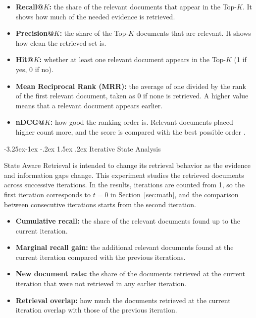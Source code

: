 \documentclass[12pt,a4paper]{report}
\makeatletter
\renewcommand\subsection{\@startsection{subsection}{2}{\z@}%
    {-3.25ex\@plus -1ex \@minus -.2ex}%
    {1.5ex \@plus .2ex}%
    {\normalfont\fontsize{14}{17}\selectfont\bfseries}}
\makeatother
\begin{document}
\begin{itemize}[leftmargin=0.25in,itemsep=0.06in,parsep=0pt]
\item \textbf{Recall@$K$:} the share of the relevant documents that appear in the Top-$K$. It shows how much of the needed evidence is retrieved.
\item \textbf{Precision@$K$:} the share of the Top-$K$ documents that are relevant. It shows how clean the retrieved set is.
\item \textbf{Hit@$K$:} whether at least one relevant document appears in the Top-$K$ (1 if yes, 0 if no).
\item \textbf{Mean Reciprocal Rank (MRR):} the average of one divided by the rank of the first relevant document, taken as 0 if none is retrieved. A higher value means that a relevant document appears earlier.
\item \textbf{nDCG@$K$:} how good the ranking order is. Relevant documents placed higher count more, and the score is compared with the best possible order \cite{jarvelin2002cumulated}.
\end{itemize}

\subsection{Iterative State Analysis}

State Aware Retrieval is intended to change its retrieval behavior as the evidence and information gaps change. This experiment studies the retrieved documents across successive iterations. In the results, iterations are counted from 1, so the first iteration corresponds to $t=0$ in Section~\ref{sec:math}, and the comparison between consecutive iterations starts from the second iteration.

\begin{itemize}[leftmargin=0.25in,itemsep=0.06in,parsep=0pt]
\item \textbf{Cumulative recall:} the share of the relevant documents found up to the current iteration.
\item \textbf{Marginal recall gain:} the additional relevant documents found at the current iteration compared with the previous iterations.
\item \textbf{New document rate:} the share of the documents retrieved at the current iteration that were not retrieved in any earlier iteration.
\item \textbf{Retrieval overlap:} how much the documents retrieved at the current iteration overlap with those of the previous iteration.
\end{itemize}
\end{document}
